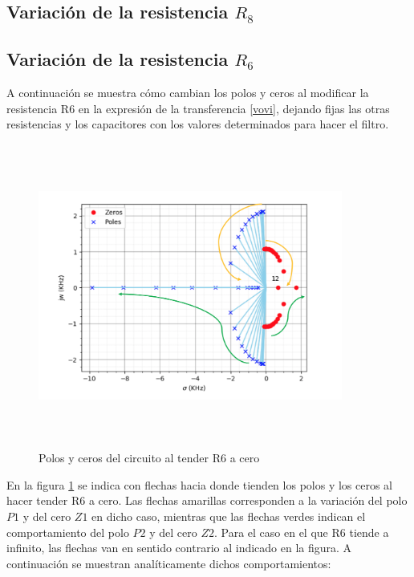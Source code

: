 \subsection{Variaci\'on de la resistencia $R_8$}


\subsection{Variaci\'on de la resistencia $R_6$}

A continuaci\'on se muestra c\'omo cambian los polos y ceros al modificar la resistencia R6 en la expresi\'on de la transferencia \ref{vovi}, dejando fijas las otras resistencias y los capacitores con los valores determinados para hacer el filtro.


\begin{figure}[H] %
	\centering
	\includegraphics[width=10cm,height=10cm,keepaspectratio]{../EJ1/00GRAFICOS/r6.png}
	\caption{Polos y ceros del circuito al tender R6 a cero}
	\label{r6}
\end{figure}

En la figura \ref{r6} se indica con flechas hacia donde tienden los polos y los ceros al hacer tender R6 a cero. Las flechas amarillas corresponden a la variaci\'on del polo $P1$ y del cero $Z1$ en dicho caso, mientras que las flechas verdes indican el comportamiento del polo $P2$ y del cero $Z2$. Para el caso en el que R6 tiende a infinito, las flechas van en sentido contrario al indicado en la figura. A continuaci\'on se muestran anal\'iticamente dichos comportamientos:

